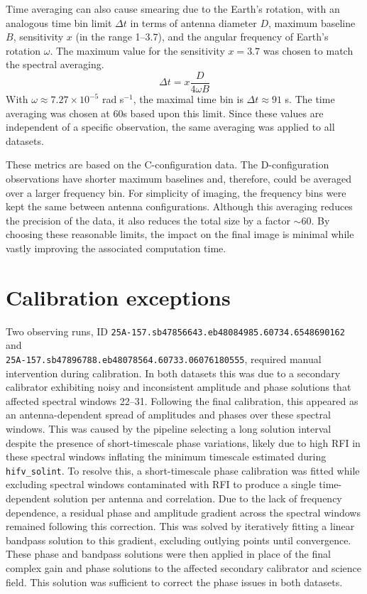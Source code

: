 Time averaging can also cause smearing due to the Earth's rotation, with an analogous time bin limit $\Delta t$ in terms of antenna diameter $D$, maximum baseline $B$, sensitivity $x$ (in the range 1--3.7), and the angular frequency of Earth's rotation $\omega$. The maximum value for the sensitivity $x=3.7$ was chosen to match the spectral averaging. 
\begin{equation}
    \Delta t = x \frac{D}{4\omega B}
\end{equation}
With $\omega \approx 7.27\times10^{-5}$ rad s$^{-1}$, the maximal time bin is $\Delta t \approx 91$ s. The time averaging was chosen at 60s based upon this limit. Since these values are independent of a specific observation, the same averaging was applied to all datasets.

These metrics are based on the C-configuration data. The D-configuration observations have shorter maximum baselines and, therefore, could be averaged over a larger frequency bin. For simplicity of imaging, the frequency bins were kept the same between antenna configurations. Although this averaging reduces the precision of the data, it also reduces the total size by a factor $\sim\!60$. By choosing these reasonable limits, the impact on the final image is minimal while vastly improving the associated computation time. 


\section{Calibration exceptions}
Two observing runs, ID \texttt{25A-157.sb47856643.eb48084985.60734.6548690162} and \\\texttt{25A-157.sb47896788.eb48078564.60733.06076180555}, required manual intervention during calibration. In both datasets this was due to a secondary calibrator exhibiting noisy and inconsistent amplitude and phase solutions that affected spectral windows 22--31. Following the final calibration, this appeared as an antenna-dependent spread of amplitudes and phases over these spectral windows. This was caused by the pipeline selecting a long solution interval despite the presence of short-timescale phase variations, likely due to high RFI in these spectral windows inflating the minimum timescale estimated during \texttt{hifv\_solint}. To resolve this, a short-timescale phase calibration was fitted while excluding spectral windows contaminated with RFI to produce a single time-dependent solution per antenna and correlation. Due to the lack of frequency dependence, a residual phase and amplitude gradient across the spectral windows remained following this correction. This was solved by iteratively fitting a linear bandpass solution to this gradient, excluding outlying points until convergence. These phase and bandpass solutions were then applied in place of the final complex gain and phase solutions to the affected secondary calibrator and science field. This solution was sufficient to correct the phase issues in both datasets. 

